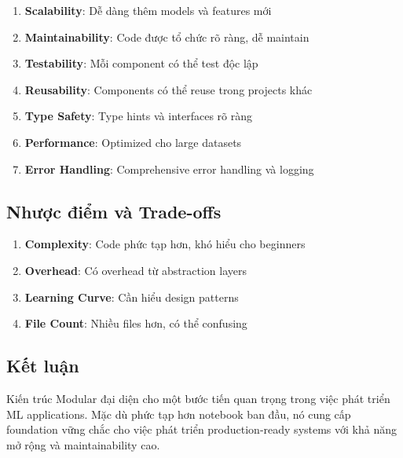\begin{enumerate}
    \item \textbf{Scalability}: Dễ dàng thêm models và features mới
    \item \textbf{Maintainability}: Code được tổ chức rõ ràng, dễ maintain
    \item \textbf{Testability}: Mỗi component có thể test độc lập
    \item \textbf{Reusability}: Components có thể reuse trong projects khác
    \item \textbf{Type Safety}: Type hints và interfaces rõ ràng
    \item \textbf{Performance}: Optimized cho large datasets
    \item \textbf{Error Handling}: Comprehensive error handling và logging
\end{enumerate}

\subsection{Nhược điểm và Trade-offs}

\begin{enumerate}
    \item \textbf{Complexity}: Code phức tạp hơn, khó hiểu cho beginners
    \item \textbf{Overhead}: Có overhead từ abstraction layers
    \item \textbf{Learning Curve}: Cần hiểu design patterns
    \item \textbf{File Count}: Nhiều files hơn, có thể confusing
\end{enumerate}

\subsection{Kết luận}

Kiến trúc Modular đại diện cho một bước tiến quan trọng trong việc phát triển ML applications. Mặc dù phức tạp hơn notebook ban đầu, nó cung cấp foundation vững chắc cho việc phát triển production-ready systems với khả năng mở rộng và maintainability cao.
